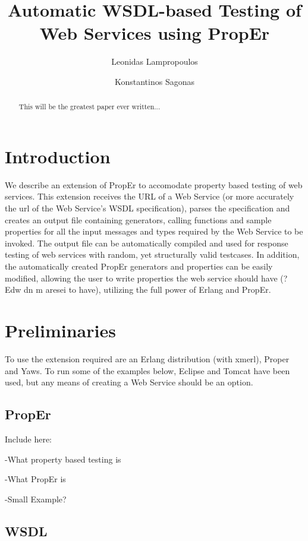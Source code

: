\documentclass[submission,copyright]{eptcs}
\title{Automatic WSDL-based Testing of Web Services using PropEr} %
\author{Leonidas Lampropoulos \and Konstantinos Sagonas}
\begin{document}
\maketitle

\begin{abstract}
 This will be the greatest paper ever written...
\end{abstract}

\section{Introduction}

We describe an extension of PropEr to accomodate property based testing of web services. This extension receives the URL of a Web Service (or more accurately the url of the Web Service's WSDL specification), parses the specification and creates an output file containing generators, calling functions and sample properties for all the input messages and types required by the Web Service to be invoked. The output file can be automatically compiled and used for response testing of web services with random, yet structurally valid testcases. In addition, the automatically created PropEr generators and properties can be easily modified, allowing the user to write properties the web service should have (? Edw dn m aresei to have), utilizing the full power of Erlang and PropEr.

\section{Preliminaries}

To use the extension required are an Erlang distribution (with xmerl), Proper and Yaws.
To run some of the examples below, Eclipse and Tomcat have been used, but any means of creating a Web Service should be an option.

\subsection{PropEr}

Include here:

-What property based testing is

-What PropEr is

-Small Example?

\subsection{WSDL}
\end{document}
